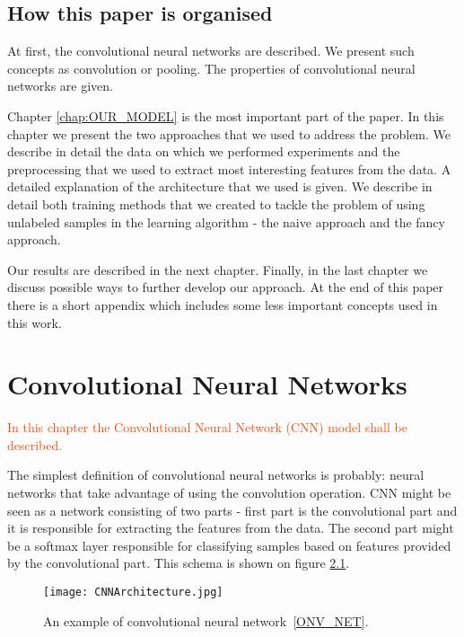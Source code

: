 \documentclass[a4paper,10pt]{report}
\newcommand{\igor}[1]{\textcolor{OrangeRed}{#1}}
\begin{document}
   
    \section{How this paper is organised}
    
    At first, the convolutional neural networks are described. We present such concepts as convolution or pooling. The properties of convolutional neural networks are given. 
    
    Chapter \ref{chap:OUR_MODEL} is the most important part of the paper. In this chapter we present the two approaches that we used to address the problem. We describe in detail the data on which we performed experiments and the preprocessing that we used to extract most interesting features from the data. A detailed explanation of the architecture that we used is given. We describe in detail both training methods that we created to tackle the problem of using unlabeled samples in the learning algorithm - the naive approach and the fancy approach. 
    
    Our results are described in the next chapter. Finally, in the last chapter we discuss possible ways to further develop our approach. At the end of this paper there is a short appendix which includes some less important concepts used in this work.
    

  \chapter{Convolutional Neural Networks}
  \igor{In this chapter the Convolutional Neural Network (CNN) model shall be described.}
  
      The simplest definition of convolutional neural networks is probably: neural networks that take advantage of using the convolution operation. CNN might be seen as a network consisting of two parts - first part is the convolutional part and it is responsible for extracting the features from the data. The second part might be a softmax layer responsible for classifying samples based on features provided by the convolutional part. This schema is shown on figure \ref{fig:con_network}. 
      
     \begin{figure}[h!] %
	  \centering
	  \texttt{[image: CNNArchitecture.jpg]}
	  \caption{An example of convolutional neural network~\ref{ONV_NET}.}
	  \label{fig:con_network}
	\end{figure} 
      
\end{document}
